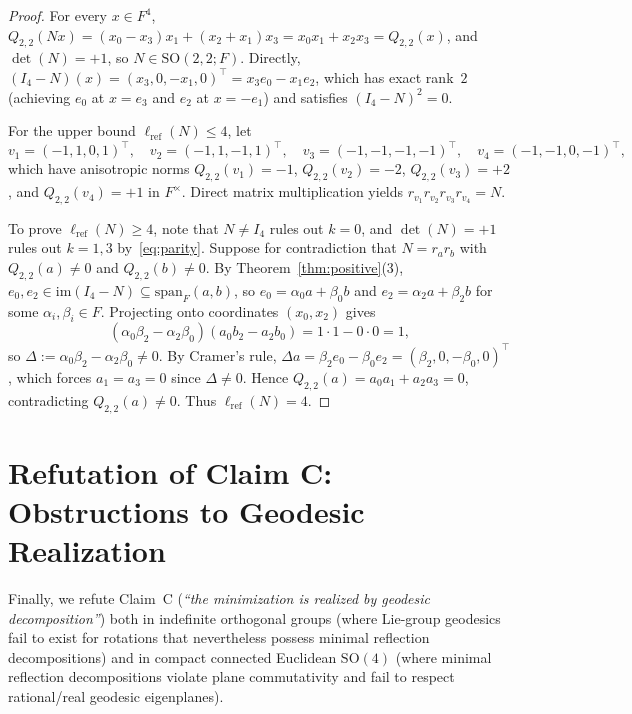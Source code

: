 \documentclass[11pt,a4paper]{article}
\theoremstyle{plain}
\theoremstyle{definition}
\newcommand{\SO}{\mathrm{SO}}
\newcommand{\lref}{\ell_{\mathrm{ref}}}
\newcommand{\im}{\mathrm{im}}
\newcommand{\spn}{\mathrm{span}}
\begin{document}
\begin{proof}
For every $x \in F^4$, $Q_{2,2}(N x) = (x_0 - x_3) x_1 + (x_2 + x_1) x_3 = x_0 x_1 + x_2 x_3 = Q_{2,2}(x)$, and $\det(N) = +1$, so $N \in \SO(2, 2; F)$. Directly, $(I_4 - N)(x) = (x_3, 0, -x_1, 0)^\top = x_3 e_0 - x_1 e_2$, which has exact rank~$2$ (achieving $e_0$ at $x = e_3$ and $e_2$ at $x = -e_1$) and satisfies $(I_4 - N)^2 = 0$.

For the upper bound $\lref(N) \le 4$, let
\[
  v_1 = (-1, 1, 0, 1)^\top,\quad v_2 = (-1, 1, -1, 1)^\top,\quad v_3 = (-1, -1, -1, -1)^\top,\quad v_4 = (-1, -1, 0, -1)^\top,
\]
which have anisotropic norms $Q_{2,2}(v_1) = -1$, $Q_{2,2}(v_2) = -2$, $Q_{2,2}(v_3) = +2$, and $Q_{2,2}(v_4) = +1$ in $F^\times$. Direct matrix multiplication yields $r_{v_1} r_{v_2} r_{v_3} r_{v_4} = N$.

To prove $\lref(N) \ge 4$, note that $N \neq I_4$ rules out $k = 0$, and $\det(N) = +1$ rules out $k = 1, 3$ by~\eqref{eq:parity}. Suppose for contradiction that $N = r_a r_b$ with $Q_{2,2}(a) \neq 0$ and $Q_{2,2}(b) \neq 0$. By Theorem~\ref{thm:positive}(3), $e_0, e_2 \in \im(I_4 - N) \subseteq \spn_F(a, b)$, so $e_0 = \alpha_0 a + \beta_0 b$ and $e_2 = \alpha_2 a + \beta_2 b$ for some $\alpha_i, \beta_i \in F$. Projecting onto coordinates $(x_0, x_2)$ gives
\[
  (\alpha_0 \beta_2 - \alpha_2 \beta_0)(a_0 b_2 - a_2 b_0) = 1 \cdot 1 - 0 \cdot 0 = 1,
\]
so $\Delta := \alpha_0 \beta_2 - \alpha_2 \beta_0 \neq 0$. By Cramer's rule, $\Delta a = \beta_2 e_0 - \beta_0 e_2 = (\beta_2, 0, -\beta_0, 0)^\top$, which forces $a_1 = a_3 = 0$ since $\Delta \neq 0$. Hence $Q_{2,2}(a) = a_0 a_1 + a_2 a_3 = 0$, contradicting $Q_{2,2}(a) \neq 0$. Thus $\lref(N) = 4$.
\end{proof}

\section{Refutation of Claim C: Obstructions to Geodesic Realization}

Finally, we refute Claim~C (\emph{``the minimization is realized by geodesic decomposition''}) both in indefinite orthogonal groups (where Lie-group geodesics fail to exist for rotations that nevertheless possess minimal reflection decompositions) and in compact connected Euclidean $\SO(4)$ (where minimal reflection decompositions violate plane commutativity and fail to respect rational/real geodesic eigenplanes).
\end{document}
